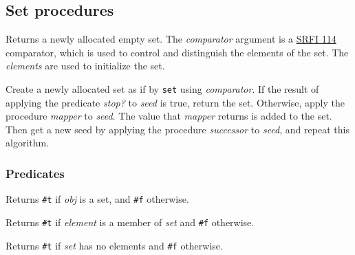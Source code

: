 \subsection{Set procedures}

\begin{entry}{%
  }

  Returns a newly allocated empty set. The \emph{comparator} argument
  is a \href{http://srfi.schemers.org/srfi-114/srfi-114.html}{SRFI
    114} comparator, which is used to control and distinguish the
  elements of the set. The \emph{elements} are used to initialize the
  set.
\end{entry}

\begin{entry}{%
  }

  Create a newly allocated set as if by \texttt{set} using
  \emph{comparator}. If the result of applying the predicate
  \emph{stop?}  to \emph{seed} is true, return the set. Otherwise,
  apply the procedure \emph{mapper} to \emph{seed}. The value that
  \emph{mapper} returns is added to the set. Then get a new seed by
  applying the procedure \emph{successor} to \emph{seed}, and repeat
  this algorithm.
\end{entry}

\subsubsection{Predicates}

\begin{entry}{%
  }

  Returns \texttt{\#t} if \emph{obj} is a set, and \texttt{\#f}
  otherwise.
\end{entry}

\begin{entry}{%
  }

  Returns \texttt{\#t} if \emph{element} is a member of \emph{set} and
  \texttt{\#f} otherwise.
\end{entry}

\begin{entry}{%
  }

  Returns \texttt{\#t} if \emph{set} has no elements and \texttt{\#f}
  otherwise.
\end{entry}


